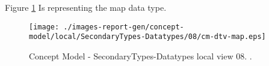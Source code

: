 Figure \ref{fig:lu.uni.lassy.excalibur.group09.spec-CM-view-local-SecondaryTypes-Datatypes-08} Is representing the map data type.



\begin{figure}[htbp] 
\label{fig:lu.uni.lassy.excalibur.group09.spec-CM}
\begin{center}
\texttt{[image: ./images-report-gen/concept-model/local/SecondaryTypes-Datatypes/08/cm-dtv-map.eps]}
\end{center}
\caption[Concept Model - SecondaryTypes-Datatypes local view 08 - ]{Concept Model - SecondaryTypes-Datatypes local view 08. .}
\label{fig:lu.uni.lassy.excalibur.group09.spec-CM-view-local-SecondaryTypes-Datatypes-08}
\end{figure}
\vspace{0.5cm} 
